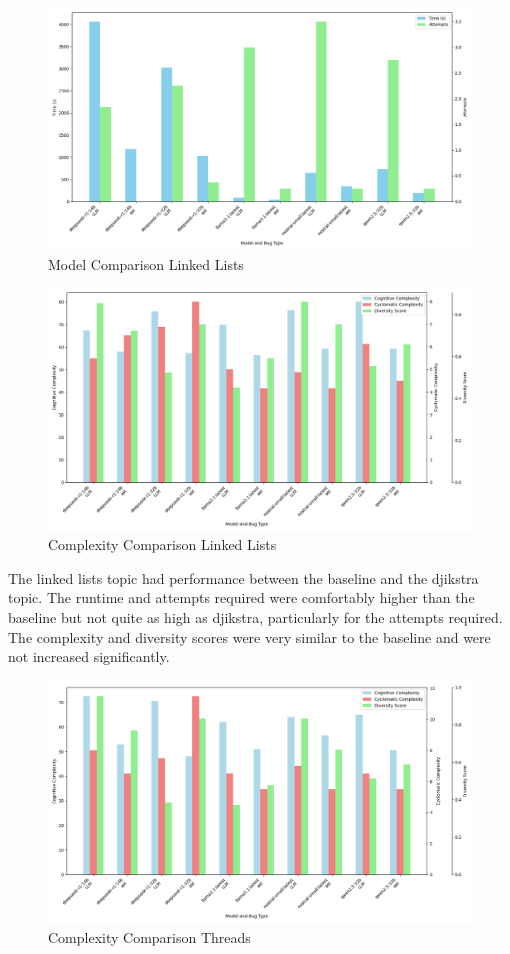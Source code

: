 \documentclass[12pt]{extarticle}
\begin{document}
\begin{figure}[H]
\centering
\includegraphics[width=0.7\linewidth]{Images/Model_Comparison_Linked_Lists.png}
\caption{Model Comparison Linked Lists}
\label{fig:Model_Comparison_Linked_Lists}
\end{figure}

\begin{figure}[H]
\centering
\includegraphics[width=0.7\linewidth]{Images/Complexity_Comparison_Linked_Lists.png}
\caption{Complexity Comparison Linked Lists}
\label{fig:Complexity_Comparison_Linked_Lists}
\end{figure}

The linked lists topic had performance between the baseline and the djikstra topic. The runtime and attempts required were comfortably higher than the baseline but not quite as high as djikstra, particularly for the attempts required. The complexity and diversity scores were very similar to the baseline and were not increased significantly. 

\begin{figure}[H]
\centering
\includegraphics[width=0.7\linewidth]{Images/Complexity_Comparison_Threads.png}
\caption{Complexity Comparison Threads}
\label{fig:Complexity_Comparison_Threads}
\end{figure}
\end{document}
